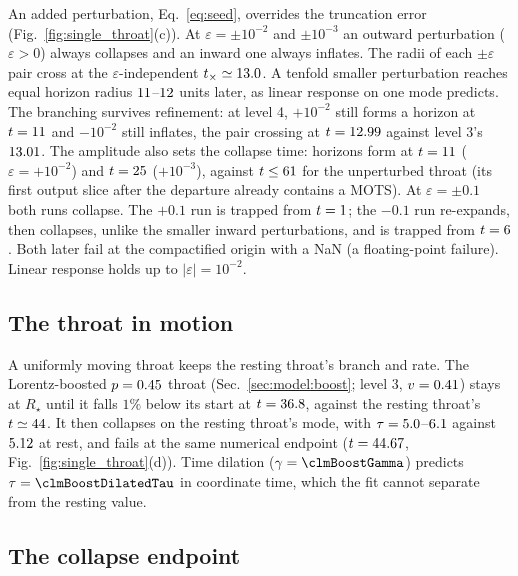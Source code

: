 \documentclass[twocolumn,floatfix,aps,prd,superscriptaddress,nofootinbib]{revtex4-2}
\begin{document}
An added perturbation, Eq.~\eqref{eq:seed}, overrides the truncation error (Fig.~\ref{fig:single_throat}(c)). At $\varepsilon=\pm10^{-2}$ and $\pm10^{-3}$ an outward perturbation ($\varepsilon>0$) always collapses and an inward one always inflates. The radii of each $\pm\varepsilon$ pair cross at the $\varepsilon$-independent $t_\times\simeq13.0$. A tenfold smaller perturbation reaches equal horizon radius $11$--$12$ units later, as linear response on one mode predicts. The branching survives refinement: at level 4, $+10^{-2}$ still forms a horizon at $t=11$ and $-10^{-2}$ still inflates, the pair crossing at $t=12.99$ against level 3's $13.01$. The amplitude also sets the collapse time: horizons form at $t=11$ ($\varepsilon=+10^{-2}$) and $t=25$ ($+10^{-3}$), against $t\le61$ for the unperturbed throat (its first output slice after the departure already contains a MOTS). At $\varepsilon=\pm0.1$ both runs collapse. The $+0.1$ run is trapped from $t=1$; the $-0.1$ run re-expands, then collapses, unlike the smaller inward perturbations, and is trapped from $t=6$. Both later fail at the compactified origin with a NaN (a floating-point failure). Linear response holds up to $|\varepsilon|=10^{-2}$.

\subsection{The throat in motion}
\label{sec:single:moving}

A uniformly moving throat keeps the resting throat's branch and rate. The Lorentz-boosted $p=0.45$ throat (Sec.~\ref{sec:model:boost}; level 3, $v=0.41$) stays at $R_\star$ until it falls $1\%$ below its start at $t=36.8$, against the resting throat's $t\simeq44$. It then collapses on the resting throat's mode, with $\tau=5.0$--$6.1$ against $5.12$ at rest, and fails at the same numerical endpoint ($t=44.67$, Fig.~\ref{fig:single_throat}(d)). Time dilation ($\gamma=\clmBoostGamma$) predicts $\tau=\clmBoostDilatedTau$ in coordinate time, which the fit cannot separate from the resting value.

\subsection{The collapse endpoint}
\label{sec:single:collapse}
\end{document}
